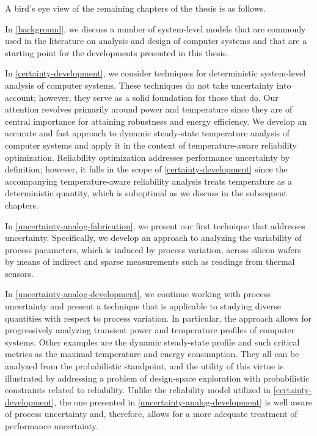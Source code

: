 A bird's eye view of the remaining chapters of the thesis is as follows.

In \cref{background}, we discuss a number of system-level models that are
commonly used in the literature on analysis and design of computer systems and
that are a starting point for the developments presented in this thesis.

In \cref{certainty-development}, we consider techniques for deterministic
system-level analysis of computer systems. These techniques do not take
uncertainty into account; however, they serve as a solid foundation for those
that do. Our attention revolves primarily around power and temperature since
they are of central importance for attaining robustness and energy efficiency.
We develop an accurate and fast approach to dynamic steady-state temperature
analysis of computer systems and apply it in the context of temperature-aware
reliability optimization. Reliability optimization addresses performance
uncertainty by definition; however, it falls in the scope of
\cref{certainty-development} since the accompanying temperature-aware
reliability analysis treats temperature as a deterministic quantity, which is
suboptimal as we discuss in the subsequent chapters.

In \cref{uncertainty-analog-fabrication}, we present our first technique that
addresses uncertainty. Specifically, we develop an approach to analyzing the
variability of process parameters, which is induced by process variation, across
silicon wafers by means of indirect and sparse measurements such as readings
from thermal sensors.

In \cref{uncertainty-analog-development}, we continue working with process
uncertainty and present a technique that is applicable to studying diverse
quantities with respect to process variation. In particular, the approach allows
for progressively analyzing transient power and temperature profiles of computer
systems. Other examples are the dynamic steady-state profile and such critical
metrics as the maximal temperature and energy consumption. They all can be
analyzed from the probabilistic standpoint, and the utility of this virtue is
illustrated by addressing a problem of design-space exploration with
probabilistic constraints related to reliability. Unlike the reliability model
utilized in \cref{certainty-development}, the one presented in
\cref{uncertainty-analog-development} is well aware of process uncertainty and,
therefore, allows for a more adequate treatment of performance uncertainty.

